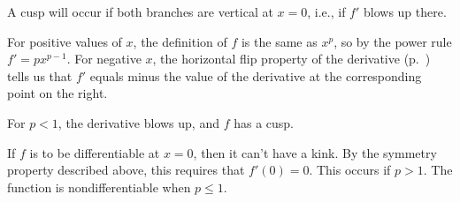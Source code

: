 A cusp will occur if both branches are vertical at $x=0$, i.e.,
if $f'$ blows up there.

For positive values of $x$, the definition of $f$ is the same as
$x^p$, so by the power rule $f'=px^{p-1}$. For negative $x$,
the horizontal flip property of the derivative
(p.~\pageref{properties-of-derivative}) tells us that $f'$
equals minus the value of the derivative at the corresponding point
on the right.

For $p<1$, the derivative blows up, and $f$ has a cusp.

If $f$ is to be differentiable at $x=0$, then it can't have a kink.
By the symmetry property described above, this requires that $f'(0)=0$.
This occurs if $p>1$. The function is nondifferentiable when $p \le 1$.
